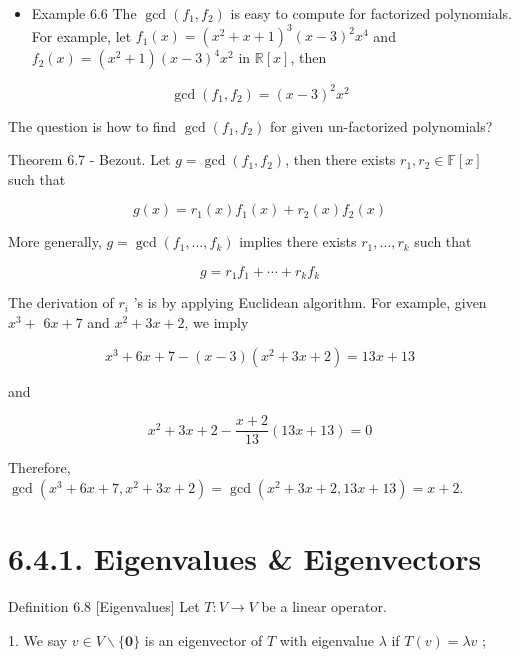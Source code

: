 \documentclass[11pt]{article}
\begin{document}
\begin{itemize}
\item Example 6.6 The \(\gcd \left( {{f}_1,{f}_2}\right)\) is easy to compute for factorized polynomials. For example, let \({f}_1\left( x\right)  = {\left( {x}^2 + x + 1\right) }^{3}{\left( x - 3\right) }^2{x}^{4}\) and \({f}_2\left( x\right)  = \left( {{x}^2 + 1}\right) {\left( x - 3\right) }^{4}{x}^2\) in \(\mathbb{R}\left\lbrack  x\right\rbrack\), then
\end{itemize}

\[
\gcd \left( {{f}_1,{f}_2}\right)  = {\left( x - 3\right) }^2{x}^2
\]

The question is how to find \(\gcd \left( {{f}_1,{f}_2}\right)\) for given un-factorized polynomials?

Theorem 6.7 - Bezout. Let \(g = \gcd \left( {{f}_1,{f}_2}\right)\), then there exists \({r}_1,{r}_2 \in  \mathbb{F}\left\lbrack  x\right\rbrack\) such that

\[
g\left( x\right)  = {r}_1\left( x\right) {f}_1\left( x\right)  + {r}_2\left( x\right) {f}_2\left( x\right)
\]

More generally, \(g = \gcd \left( {{f}_1,\ldots ,{f}_{k}}\right)\) implies there exists \({r}_1,\ldots ,{r}_{k}\) such that

\[
g = {r}_1{f}_1 + \cdots  + {r}_{k}{f}_{k}
\]

The derivation of \({r}_{i}\) ’s is by applying Euclidean algorithm. For example, given \({x}^{3} +\)  \({6x} + 7\) and \({x}^2 + {3x} + 2\), we imply

\[
{x}^{3} + {6x} + 7 - \left( {x - 3}\right) \left( {{x}^2 + {3x} + 2}\right)  = {13x} + {13}
\]

and

\[
{x}^2 + {3x} + 2 - \frac{x + 2}{13}\left( {{13x} + {13}}\right)  = 0
\]

Therefore, \(\gcd \left( {{x}^{3} + {6x} + 7,{x}^2 + {3x} + 2}\right)  = \gcd \left( {{x}^2 + {3x} + 2,{13x} + {13}}\right)  = x + 2\).

\section*{6.4.1. Eigenvalues \& Eigenvectors}

Definition 6.8 [Eigenvalues] Let \(T : V \rightarrow  V\) be a linear operator.

1. We say \(v \in  V \smallsetminus  \{ \mathbf{0}\}\) is an eigenvector of \(T\) with eigenvalue \(\lambda\) if \(T\left( v\right)  = {\lambda v}\) ;
\end{document}
